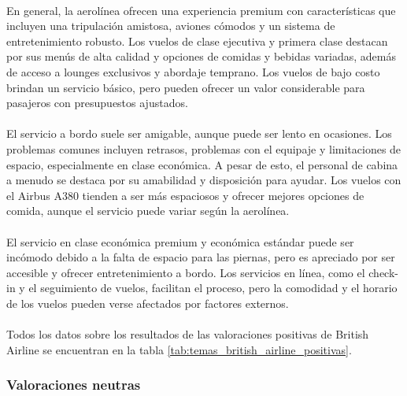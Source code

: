 \documentclass{report}
\begin{document}
                    \paragraph*{}{
                        En general, la aerolínea ofrecen una experiencia premium con características que incluyen una tripulación amistosa, aviones cómodos y un sistema de entretenimiento robusto. Los vuelos de clase ejecutiva y primera clase destacan por sus menús de alta calidad y opciones de comidas y bebidas variadas, además de acceso a lounges exclusivos y abordaje temprano. Los vuelos de bajo costo brindan un servicio básico, pero pueden ofrecer un valor considerable para pasajeros con presupuestos ajustados.
                    }
                    \paragraph*{}{
                        El servicio a bordo suele ser amigable, aunque puede ser lento en ocasiones. Los problemas comunes incluyen retrasos, problemas con el equipaje y limitaciones de espacio, especialmente en clase económica. A pesar de esto, el personal de cabina a menudo se destaca por su amabilidad y disposición para ayudar. Los vuelos con el Airbus A380 tienden a ser más espaciosos y ofrecer mejores opciones de comida, aunque el servicio puede variar según la aerolínea.
                    }
                    \paragraph*{}{
                        El servicio en clase económica premium y económica estándar puede ser incómodo debido a la falta de espacio para las piernas, pero es apreciado por ser accesible y ofrecer entretenimiento a bordo. Los servicios en línea, como el check-in y el seguimiento de vuelos, facilitan el proceso, pero la comodidad y el horario de los vuelos pueden verse afectados por factores externos.
                    }
                    \paragraph*{}{
                        Todos los datos sobre los resultados de las valoraciones positivas de British Airline se encuentran en la tabla \ref{tab:temas_british_airline_positivas}.
                    }
                \subsubsection*{Valoraciones neutras}
\end{document}

